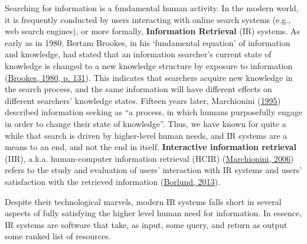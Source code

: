 \documentclass[letterpaper, nobind]{templates/ociamthesis}
\begin{document}
Searching for information is a fundamental human activity. In the modern world, it is frequently conducted by users interacting with online search systems (e.g., web search engines), or more formally, \textbf{Information Retrieval} (IR) systems.
As early as in 1980, Bertam Brookes, in his `fundamental equation' of information and knowledge, had stated that an information searcher's current state of knowledge is changed to a new knowledge structure by exposure to information (\protect\hyperlink{ref-brookes1980foundations}{Brookes, 1980, p. 131}).
This indicates that searchers acquire new knowledge in the search process, and the same information will have different effects on different searchers' knowledge states.
Fifteen years later, Marchionini (\protect\hyperlink{ref-marchionini1995information}{1995}) described information seeking as ``a process, in which humans purposefully engage in order to change
their state of knowledge''.
Thus, we have known for quite a while that search is driven by higher-level human needs, and IR systems are a means to an end, and not the end in itself.
\textbf{Interactive information retrieval} (IIR), a.k.a. human-computer information retrieval (HCIR) (\protect\hyperlink{ref-marchionini2006toward}{Marchionini, 2006}) refers to the study and evaluation of users' interaction with IR systems and users' satisfaction with the retrieved information (\protect\hyperlink{ref-borlund2013interactive}{Borlund, 2013}).

Despite their technological marvels, modern IR systems falls short in several aspects of fully satisfying the higher level human need for information.
In essence, IR systems are software that take, as input, some query, and return as output some ranked list of resources.
\end{document}
